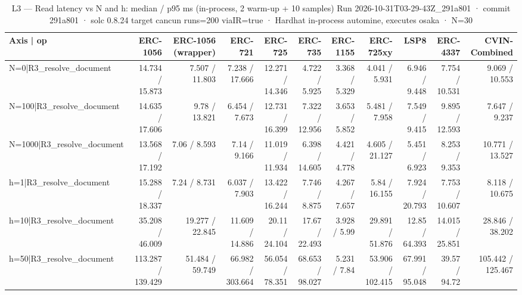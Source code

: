 \begin{table}[ht]
\centering
\small
\begin{tabular}{lrrrrrrrrrr}
\toprule
Axis | op & ERC-1056 & ERC-1056 (wrapper) & ERC-721 & ERC-725 & ERC-735 & ERC-1155 & ERC-725xy & LSP8 & ERC-4337 & CVIN-Combined \\
\midrule
N=0|R3\_resolve\_document & 14.734 / 15.873 & 7.507 / 11.803 & 7.238 / 17.666 & 12.271 / 14.346 & 4.722 / 5.925 & 3.368 / 5.329 & 4.041 / 5.931 & 6.946 / 9.448 & 7.754 / 10.531 & 9.069 / 10.553 \\
N=100|R3\_resolve\_document & 14.635 / 17.606 & 9.78 / 13.821 & 6.454 / 7.673 & 12.731 / 16.399 & 7.322 / 12.956 & 3.653 / 5.852 & 5.481 / 7.958 & 7.549 / 9.415 & 9.895 / 12.593 & 7.647 / 9.237 \\
N=1000|R3\_resolve\_document & 13.568 / 17.192 & 7.06 / 8.593 & 7.14 / 9.166 & 11.019 / 11.934 & 6.398 / 14.605 & 4.421 / 4.778 & 4.605 / 21.127 & 5.451 / 6.923 & 8.253 / 9.353 & 10.771 / 13.527 \\
h=1|R3\_resolve\_document & 15.288 / 18.337 & 7.24 / 8.731 & 6.037 / 7.903 & 13.422 / 16.244 & 7.746 / 8.875 & 4.267 / 7.657 & 5.84 / 16.155 & 7.924 / 20.793 & 7.753 / 10.607 & 8.118 / 10.675 \\
h=10|R3\_resolve\_document & 35.208 / 46.009 & 19.277 / 22.845 & 11.609 / 14.886 & 20.11 / 24.104 & 17.67 / 22.493 & 3.928 / 5.99 & 29.891 / 51.876 & 12.85 / 64.393 & 14.015 / 25.851 & 28.846 / 38.202 \\
h=50|R3\_resolve\_document & 113.287 / 139.429 & 51.484 / 59.749 & 66.982 / 303.664 & 56.054 / 78.351 & 68.653 / 98.027 & 5.231 / 7.84 & 53.906 / 102.415 & 67.991 / 95.048 & 39.57 / 94.72 & 105.442 / 125.467 \\
\bottomrule
\end{tabular}
\caption{L3 — Read latency vs N and h: median / p95 ms (in-process, 2 warm-up + 10 samples) Run 2026-10-31T03-29-43Z\_291a801 · commit 291a801 · solc 0.8.24 target cancun runs=200 viaIR=true · Hardhat in-process automine, executes osaka · N=30}
\label{tab:scale_latency}
\end{table}
